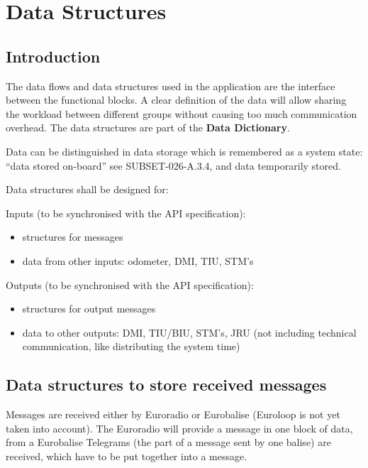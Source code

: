 
\section{Data Structures} \label{ss:datascructures}
\subsection{Introduction}
The data flows and data structures used in the application are the interface between the functional blocks. A clear definition of the data will allow sharing the workload between different groups without causing too much communication overhead. The data structures are part of the \textbf{Data Dictionary}.

Data can be distinguished in data storage which is remembered as a system state: “data stored on-board” see SUBSET-026-A.3.4, and data temporarily stored.


Data structures shall be designed for:

Inputs (to be synchronised with the API specification):
\begin{itemize}
\item structures for messages
\item data from other inputs: odometer, DMI, TIU, STM's
\end{itemize}

Outputs (to be synchronised with the API specification):
\begin{itemize}
\item structures for output messages
\item data to other outputs: DMI, TIU/BIU, STM's, JRU (not including technical communication, like distributing the system time)
\end{itemize}


\subsection{Data structures to store received messages}
Messages are received either by Euroradio or Eurobalise (Euroloop is not yet taken into account). The Euroradio will provide a message in one block of data, from a Eurobalise Telegrams (the part of a message sent by one balise) are received, which have to be put together into a message.

